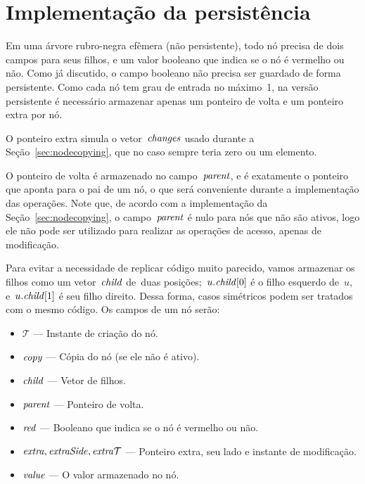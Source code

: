 \documentclass[main.tex]{subfiles}
\begin{document}
\section{Implementação da persistência}

\newcommand{\ts}{\mathcal{T}}
\newcommand{\cp}{\V{copy}}
\newcommand{\child}{\V{child}}
\newcommand{\parent}{\V{parent}}
\newcommand{\red}{\V{red}}
\newcommand{\extra}{\V{extra}}
\newcommand{\eSide}{\V{extraSide}}
\newcommand{\eTs}{\V{extra\mathcal{T}}}
\newcommand{\version}{\V{version}}
\newcommand{\side}{\V{side}}
\newcommand{\roots}{\V{roots}}
\newcommand{\val}{\V{value}}
\newcommand{\cur}{\V{current}}


Em uma árvore rubro-negra efêmera (não persistente), todo nó precisa de dois campos para seus filhos, e um valor booleano que indica se o nó é vermelho ou não. Como já discutido, o campo booleano não precisa ser guardado de forma persistente. Como cada nó tem grau de entrada no máximo~1, na versão persistente é necessário armazenar apenas um ponteiro de volta e um ponteiro extra por nó.

O ponteiro extra simula o vetor~$\mathit{changes}$ usado durante a Seção~\ref{sec:nodecopying}, que no caso sempre teria zero ou um elemento.

O ponteiro de volta é armazenado no campo~$\parent$, e é exatamente o ponteiro que aponta para o pai de um nó, o que será conveniente durante a implementação das operações. Note que, de acordo com a implementação da Seção~\ref{sec:nodecopying}, o campo~$\parent$ é nulo para nós que não são ativos, logo ele não pode ser utilizado para realizar as operações de acesso, apenas de modificação.

Para evitar a necessidade de replicar código muito parecido, vamos armazenar os filhos como um vetor~$\child$ de~duas posições;~$u.\child[0]$ é o filho esquerdo de~$u$, e~$u.\child[1]$ é seu filho direito. Dessa forma, casos simétricos podem ser tratados com o mesmo código. Os campos de um nó serão:
\begin{itemize}
\item $\ts$ --- Instante de criação do nó.
\item $\cp$ --- Cópia do nó (se ele não é ativo).
\item $\child$ --- Vetor de filhos.
\item $\parent$ --- Ponteiro de volta.
\item $\red$ --- Booleano que indica se o nó é vermelho ou não.
\item $\extra, \eSide, \eTs$ --- Ponteiro extra, seu lado e instante de modificação.
\item $\val$ --- O valor armazenado no nó.
\end{itemize}
\end{document}
